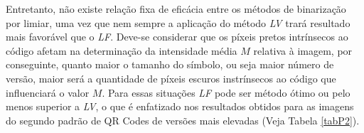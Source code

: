 \documentclass{ceel}
\begin{document}
\begin{multicols}{2}
Entretanto, não existe relação fixa de eficácia entre os métodos de binarização por limiar, uma vez que nem sempre a aplicação do método \emph{LV} trará resultado mais favorável que o \emph{LF}. Deve-se considerar que os píxeis pretos intrínsecos ao código afetam na determinação da intensidade média $M$ relativa à imagem, por conseguinte, quanto maior o tamanho do símbolo, ou seja maior número de versão, maior será a quantidade de píxeis escuros instrínsecos ao código que influenciará o valor $M$. Para essas situações \emph{LF} pode ser método ótimo ou pelo menos superior a \emph{LV}, o que é enfatizado nos resultados obtidos para as imagens do segundo padrão de QR Codes de versões mais elevadas (Veja Tabela \ref{tabP2}).

\hspace{-0.43cm}
\begin{minipage}[h]{\columnwidth}
\captionsetup{type=figure}
 \hfill
{}\\
\hfill
{}\\

\end{minipage}
\end{multicols}
\end{document}

